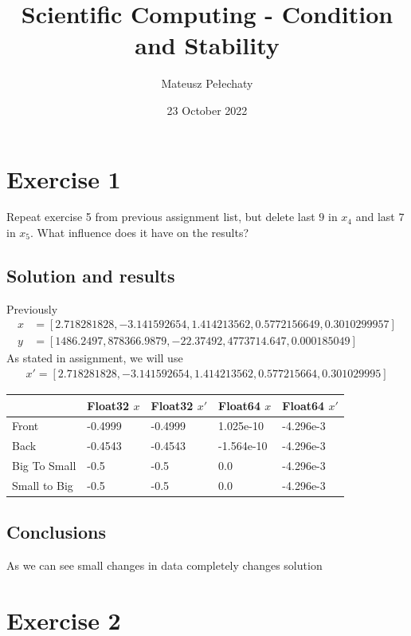 \documentclass[12pt]{article}
\title{Scientific Computing - Condition and Stability}
\author{Mateusz Pełechaty}
\date{23 October 2022}%
\begin{document}
\maketitle
\section*{Exercise 1}
Repeat exercise 5 from previous assignment list, but delete last $9$ in $x_4$ and last $7$ in $x_5$. What influence does it have on the results?
\subsection*{Solution and results}
Previously 
\begin{align*}
x &= [2.718281828, -3.141592654, 1.414213562, 0.5772156649, 0.3010299957]\\
y &= [1486.2497, 878366.9879, -22.37492, 4773714.647, 0.000185049]
\end{align*}
As stated in assignment, we will use 
\begin{align*}
x' = [2.718281828, -3.141592654, 1.414213562, 0.577215664, 0.301029995]
\end{align*}

\begin{table}[!ht]
    \centering
    \begin{tabular}{|l|l|l|l|l|}
    \hline
        ~ & Float32 $x$ & Float32 $x'$ & Float64 $x$ & Float64 $x'$ \\ \hline
        Front & -0.4999 & -0.4999 & 1.025e-10 & -4.296e-3 \\ \hline
        Back & -0.4543 & -0.4543 & -1.564e-10 & -4.296e-3 \\ \hline
        Big To Small & -0.5 & -0.5 & 0.0 & -4.296e-3 \\ \hline
        Small to Big & -0.5 & -0.5 & 0.0 & -4.296e-3 \\ \hline
    \end{tabular}
\end{table}
\subsection*{Conclusions}
As we can see small changes in data completely changes solution

\section*{Exercise 2}
\end{document}
